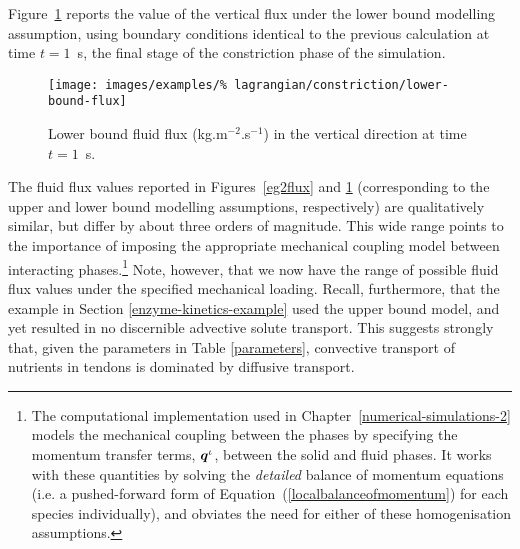 Figure~{\ref{lowerbound}} reports the value of the vertical flux under
the lower bound modelling assumption, using boundary conditions
identical to the previous calculation at time $t=1$~s, the final stage
of the constriction phase of the simulation.

\begin{figure}[!hpt]
  \centering
  \texttt{[image: images/examples/\%
    lagrangian/constriction/lower-bound-flux]}
  \caption{Lower bound fluid flux (kg.m$^{-2}$.s$^{-1}$) in the
    vertical direction at time $t=1$~s.}
  \label{lowerbound}
\end{figure}

The fluid flux values reported in Figures~\ref{eg2flux} and
\ref{lowerbound} (corresponding to the upper and lower bound modelling
assumptions, respectively) are qualitatively similar, but differ by
about three orders of magnitude. This wide range points to the
importance of imposing the appropriate mechanical coupling model
between interacting phases.\footnote{The computational implementation
  used in Chapter~\ref{numerical-simulations-2} models the mechanical
  coupling between the phases by specifying the momentum transfer
  terms, $\mbox{\boldmath$ q$}^{\iota}$, between the solid and fluid phases. It works
  with these quantities by solving the {\em detailed} balance of
  momentum equations (i.e. a pushed-forward form of
  Equation~(\ref{localbalanceofmomentum}) for each species
  individually), and obviates the need for either of these
  homogenisation assumptions.}  Note, however, that we now have the
range of possible fluid flux values under the specified mechanical
loading. Recall, furthermore, that the example in Section
\ref{enzyme-kinetics-example} used the upper bound model, and yet
resulted in no discernible advective solute transport. This suggests
strongly that, given the parameters in Table \ref{parameters},
convective transport of nutrients in tendons is dominated by diffusive
transport.


